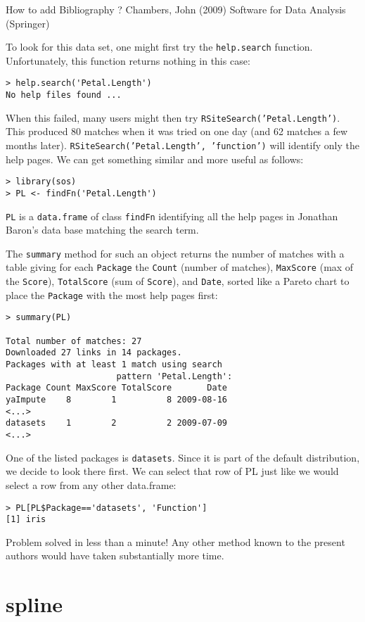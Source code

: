 How to add Bibliography ?
Chambers, John (2009) Software for Data Analysis (Springer)

To look for this data set, one might first try 
the {\tt help.search} function.  Unfortunately, this function 
returns nothing in this case:  
\begin{verbatim}
> help.search('Petal.Length')
No help files found ...
\end{verbatim}
When this failed, many users might then try
{\tt RSiteSearch('Petal.Length')}.  This produced 80 matches when
it was tried on one day (and 62 matches a few months later).
{\tt RSiteSearch('Petal.Length', 'function')} will identify
only the help pages.  We can get something similar and more
useful as follows:
\begin{verbatim}
> library(sos)
> PL <- findFn('Petal.Length')
\end{verbatim}
{\tt PL} is a {\tt data.frame} of class {\tt findFn} identifying
all the help pages in Jonathan Baron's data base matching the
search term.

The {\tt summary} method for such an object returns
the number of matches with a table giving for each {\tt Package}
the {\tt Count} (number of matches), {\tt MaxScore} (max of the
{\tt Score}), {\tt TotalScore} (sum of {\tt Score}), and {\tt Date},
sorted like a Pareto chart to place the {\tt Package} with the most
help pages first:
\begin{verbatim}
> summary(PL)

Total number of matches: 27
Downloaded 27 links in 14 packages.
Packages with at least 1 match using search
                      pattern 'Petal.Length':
Package Count MaxScore TotalScore       Date
yaImpute    8        1          8 2009-08-16
<...>
datasets    1        2          2 2009-07-09
<...>
\end{verbatim}
One of the listed packages is {\tt datasets}.  Since it is part of the
default \R{} distribution, we decide to look there first.  We can
select that row of PL just like we would select a row from any other
data.frame:
\begin{verbatim}
> PL[PL$Package=='datasets', 'Function']
[1] iris
\end{verbatim}
Problem solved in less than a minute!  Any other method known
to the present authors would have taken substantially more time.

\section*{spline}

